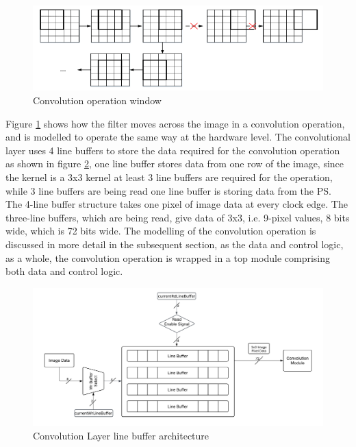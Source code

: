     \begin{figure}[H]
        \centering
        \includegraphics[width=\textwidth]{images/conv_window.png}
        \caption{Convolution operation window}
        \label{fig:conv_window}
    \end{figure}

    \noindent Figure \ref{fig:conv_window} shows how the filter moves across the image in a convolution operation, and is modelled to operate the same way at the hardware level.
    The convolutional layer uses 4 line buffers to store the data required for the convolution operation as shown in figure \ref{fig:line_buffer_architecture}, one line buffer stores data from one row of the image, since the kernel is a 3x3 kernel at least 3 line buffers are required for the operation, while 3 line buffers are being read one line buffer is storing data from the PS. The 4-line buffer structure takes one pixel of image data at every clock edge. The three-line buffers, which are being read, give data of 3x3, i.e. 9-pixel values, 8 bits wide, which is 72 bits wide. The modelling of the convolution operation is discussed in more detail in the subsequent section, as the data and control logic, as a whole, the convolution operation is wrapped in a top module comprising both data and control logic.
    
    

    \begin{figure}[H]
    \centering
    \includegraphics[width=\linewidth]{images/CONV_Architecture.png} 
    \caption{Convolution Layer line buffer architecture}
    \label{fig:line_buffer_architecture}
    \end{figure}

